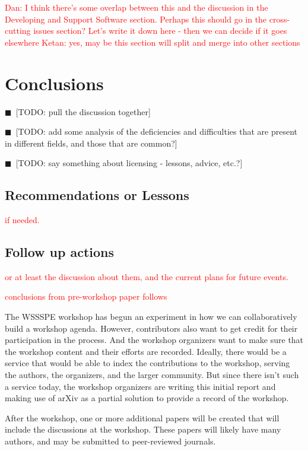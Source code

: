 \documentclass[11pt, oneside]{amsart}
\newcommand{\todo}[1]{{\color{blue}$\blacksquare$~\textsf{[TODO: #1]}}}
\newcommand{\note}[1]{ {\textcolor{red}    { #1 }}}
\begin{document}

\note{Dan: I think there's some overlap
  between this and the discussion in the Developing and Support
  Software section.  Perhaps this should go in the cross-cutting
  issues section?  Let's write it down here - then we can decide if it goes elsewhere}
\note{Ketan: yes, may be this section will split and merge into other sections}

\section{Conclusions} \label{sec:conclusions}

\todo{pull the discussion together}

\todo{add some analysis of the deficiencies and difficulties that are
  present in different fields, and those that are common?}

\todo{say something about licensing - lessons, advice, etc.?}

\subsection{Recommendations or Lessons}

\note{if needed.}

\subsection{Follow up actions}

\note{or at least the discussion about them, and the current plans for
  future events.}

\note{conclusions from pre-workshop paper follows}

The WSSSPE workshop has begun an experiment in how we can
collaboratively build a workshop agenda. However, contributors also
want to get credit for their participation in the process. And the
workshop organizers want to make sure that the workshop content and
their efforts are recorded.  Ideally, there would be a service that
would be able to index the contributions to the workshop, serving the
authors, the organizers, and the larger community. But since there
isn't such a service today, the workshop organizers are writing this
initial report and making use of arXiv as a partial solution to
provide a record of the workshop.

After the workshop, one or more additional papers will be created that
will include the discussions at the workshop. These papers will likely
have many authors, and may be submitted to peer-reviewed journals.
\end{document}
